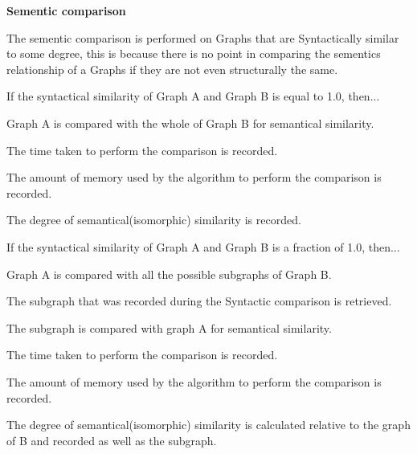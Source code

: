 \begin{myEnumerate}
\begin{myEnumerate}
			\item \textbf{Sementic comparison}
				\begin{myEnumerate}
					\item The sementic comparison is performed on Graphs that are Syntactically similar to some degree, this is because there is no point in comparing the sementics relationship of a Graphs if they are not even structurally the same.
						\begin{myEnumerate}
							\item If the syntactical similarity of Graph A and Graph B is equal to 1.0, then...
								\begin{myEnumerate}
									\item Graph A is compared with the whole of Graph B for semantical similarity.
										\begin{myEnumerate}
											 \item The time taken to perform the comparison is recorded.
											 \item The amount of memory used by the algorithm to perform the comparison is recorded.
											 \item The degree of semantical(isomorphic) similarity is recorded.											
										\end{myEnumerate}
								\end{myEnumerate}
							\item If the syntactical similarity of Graph A and Graph B is a fraction of 1.0, then...
								\begin{myEnumerate}
									\item Graph A is compared with all the possible subgraphs of Graph B.
										\begin{myEnumerate}										
										  \item The subgraph that was recorded during the Syntactic comparison is retrieved.
										  \item The subgraph is compared with graph A for semantical similarity.
											\begin{myEnumerate}
												\item The time taken to perform the comparison is recorded.
												\item The amount of memory used by the algorithm to perform the comparison is recorded.
												 \item The degree of semantical(isomorphic) similarity is calculated relative to the graph of B and recorded as well as the subgraph.
											\end{myEnumerate}
										\end{myEnumerate}
								\end{myEnumerate}
						\end{myEnumerate}
				\end{myEnumerate}
		\end{myEnumerate}
\end{myEnumerate}


